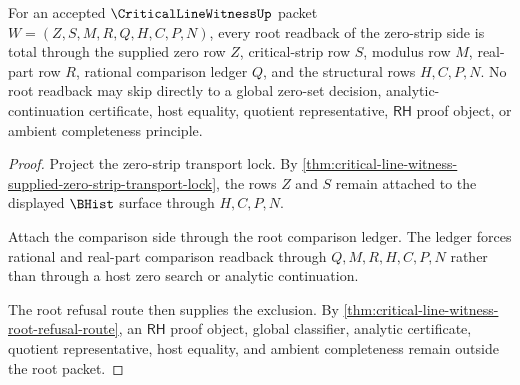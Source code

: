 \begin{theorem}
\label{thm:critical-line-witness-zero-strip-readback-totality}
For an accepted $\CriticalLineWitnessUp$ packet $W=(Z,S,M,R,Q,H,C,P,N)$, every root readback of the zero-strip side is total through the supplied zero row $Z$, critical-strip row $S$, modulus row $M$, real-part row $R$, rational comparison ledger $Q$, and the structural rows $H,C,P,N$. No root readback may skip directly to a global zero-set decision, analytic-continuation certificate, host equality, quotient representative, $\mathsf{RH}$ proof object, or ambient completeness principle.
\end{theorem}
\begin{proof}
Project the zero-strip transport lock. By \autoref{thm:critical-line-witness-supplied-zero-strip-transport-lock}, the rows $Z$ and $S$ remain attached to the displayed $\BHist$ surface through $H,C,P,N$.

Attach the comparison side through the root comparison ledger. The ledger forces rational and real-part comparison readback through $Q,M,R,H,C,P,N$ rather than through a host zero search or analytic continuation.

The root refusal route then supplies the exclusion. By \autoref{thm:critical-line-witness-root-refusal-route}, an $\mathsf{RH}$ proof object, global classifier, analytic certificate, quotient representative, host equality, and ambient completeness remain outside the root packet.
\end{proof}

